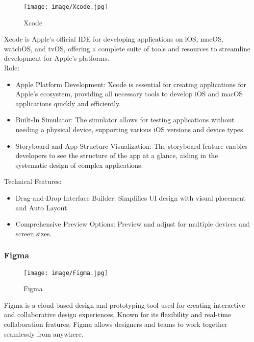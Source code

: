 \documentclass[conference]{IEEEtran}
\begin{document}
\begin{figure}[h!]
    \centering
    \texttt{[image: image/Xcode.jpg]}
    \caption{Xcode}
    \label{fig:enter-label}
\end{figure}

\noindent Xcode is Apple’s official IDE for developing applications on iOS, macOS, watchOS, and tvOS, offering a complete suite of tools and resources to streamline development for Apple’s platforms.\\

Role:
\begin{itemize}
    \item Apple Platform Development: Xcode is essential for creating applications for Apple’s ecosystem, providing all necessary tools to develop iOS and macOS applications quickly and efficiently. \\
    \item Built-In Simulator: The simulator allows for testing applications without needing a physical device, supporting various iOS versions and device types.\\
    \item Storyboard and App Structure Visualization: The storyboard feature enables developers to see the structure of the app at a glance, aiding in the systematic design of complex applications.\\
\end{itemize}

Technical Features:
\begin{itemize}
    \item Drag-and-Drop Interface Builder: Simplifies UI design with visual placement and Auto Layout.\\
    \item Comprehensive Preview Options: Preview and adjust for multiple devices and screen sizes.\\
\end{itemize}


\subsubsection{Figma}

\begin{figure}[h!]
    \centering
    \texttt{[image: image/Figma.jpg]}
    \caption{Figma}
    \label{fig:enter-label}
\end{figure}

\noindent Figma is a cloud-based design and prototyping tool used for creating interactive and collaborative design experiences. Known for its flexibility and real-time collaboration features, Figma allows designers and teams to work together seamlessly from anywhere.\\
\end{document}
